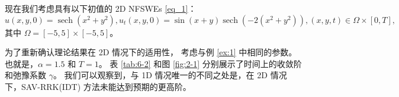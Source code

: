 		\begin{example}\label{ex:2}
			现在我们考虑具有以下初值的 2D NFSWEs \eqref{eq_1}：
			\begin{equation*}
			u(x, y, 0)=\operatorname{sech}\left(x^2+y^2\right), u_t(x, y, 0)=\sin (x+y) \operatorname{sech}\left(-2\left(x^2+y^2\right)\right),(x, y, t) \in \Omega \times[0, T],
			\end{equation*}
			其中 $\Omega=[-5,5] \times[-5,5]$。
			\end{example}
				
				
			为了重新确认理论结果在 2D 情况下的适用性，
			考虑与例 \ref{ex:1} 中相同的参数。也就是，$\alpha=1.5$ 和 $T=1$。
			表 \ref{tab:6-2} 和图 \ref{fig:2-1} 分别展示了时间上的收敛阶和弛豫系数 $\gamma$。
			我们可以观察到，与 1D 情况唯一的不同之处是，在 2D 情况下，SAV-RRK(IDT) 方法未能达到预期的更高阶。
	
